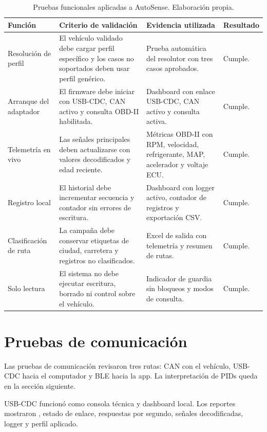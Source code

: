 \documentclass[12pt,letterpaper]{report}
\begin{document}
\begin{table}[!htbp]
\centering
\scriptsize
\caption{Pruebas funcionales aplicadas a AutoSense. Elaboración propia.}
\label{tab:functional-tests}
\begin{tabular}{@{}p{}p{}p{}p{}@{}}
\toprule
\textbf{Función} & \textbf{Criterio de validación} & \textbf{Evidencia utilizada} & \textbf{Resultado} \\
\midrule
Resolución de perfil & El vehículo validado debe cargar perfil específico y los casos no soportados deben usar perfil genérico. & Prueba automática del resolutor con tres casos aprobados. & Cumple. \\
\addlinespace
Arranque del adaptador & El firmware debe iniciar con USB-CDC, CAN activo y consulta OBD-II habilitada. & Dashboard con enlace USB-CDC, CAN activo y consulta activa. & Cumple. \\
\addlinespace
Telemetría en vivo & Las señales principales deben actualizarse con valores decodificados y edad reciente. & Métricas OBD-II con RPM, velocidad, refrigerante, MAP, acelerador y voltaje ECU. & Cumple. \\
\addlinespace
Registro local & El historial debe incrementar secuencia y contador sin errores de escritura. & Dashboard con logger activo, contador de registros y exportación CSV. & Cumple. \\
\addlinespace
Clasificación de ruta & La campaña debe conservar etiquetas de ciudad, carretera y registros no clasificados. & Excel de salida con telemetría y resumen de rutas. & Cumple. \\
\addlinespace
Solo lectura & El sistema no debe ejecutar escritura, borrado ni control sobre el vehículo. & Indicador de guardia sin bloqueos y modos de consulta. & Cumple. \\
\bottomrule
\end{tabular}
\end{table}

\section{Pruebas de comunicación}

Las pruebas de comunicación revisaron tres rutas: CAN con el vehículo, USB-CDC hacia el computador y BLE hacia la app. La interpretación de PIDs queda en la sección siguiente.

USB-CDC funcionó como consola técnica y dashboard local. Los reportes mostraron , estado de enlace, respuestas por segundo, señales decodificadas, logger y perfil aplicado.
\end{document}
